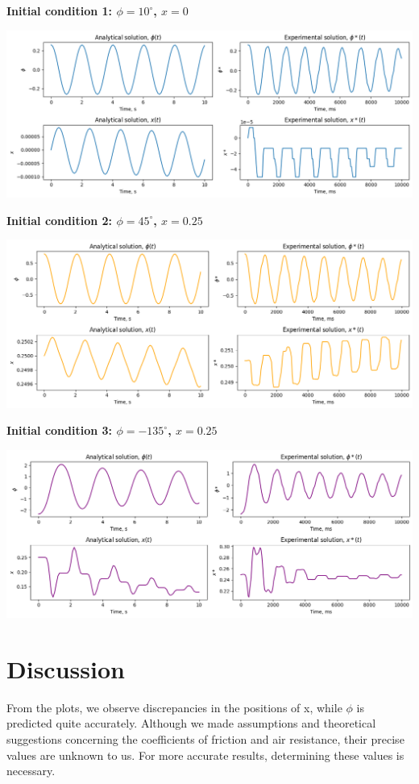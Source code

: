 \documentclass{article}
\begin{document}
\textbf{Initial condition 1: $\phi = 10^\circ$, $x = 0$}

\includegraphics*[scale=0.45]{plots/res_comparison_init1.png}

\newpage

\textbf{Initial condition 2: $\phi = 45^\circ$, $x = 0.25$}

\includegraphics*[scale=0.45]{plots/res_comparison_init2.png}


\textbf{Initial condition 3: $\phi = -135^\circ$, $x = 0.25$}

\includegraphics*[scale=0.45]{plots/res_comparison_init3.png}

\section{Discussion}

From the plots, we observe discrepancies in the positions of x, while $\phi$ is predicted quite accurately. Although we made assumptions and theoretical suggestions concerning the coefficients of friction and air resistance, their precise values are unknown to us. For more accurate results, determining these values is necessary. 
\end{document}
